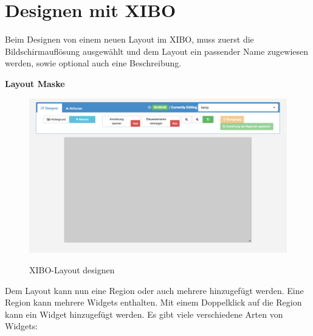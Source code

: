 \section{Designen mit XIBO}\label{sec:designexibo}
Beim Designen von einem neuen Layout im XIBO, muss zuerst die Bildschirmauflösung ausgewählt und dem Layout ein passender Name zugewiesen werden, sowie optional auch eine Beschreibung. 

\textbf{Layout Maske}

\begin{figure}[H]
	\centering
\includegraphics[width=1\textwidth]{images/xibo-basics-designer}
	\label{img:designeLayout}
	\caption{XIBO-Layout designen}
\end{figure}	

Dem Layout kann nun eine Region oder auch mehrere  hinzugefügt werden. Eine Region kann mehrere Widgets enthalten. Mit einem Doppelklick auf die Region kann ein Widget hinzugefügt werden. Es gibt viele verschiedene Arten von Widgets:

